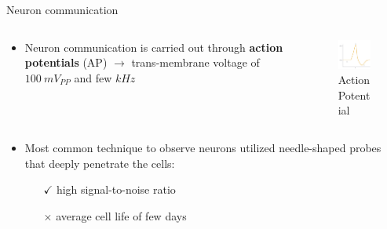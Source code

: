 \documentclass{beamer}
\begin{document}
\begin{frame}{Neuron communication}
\vspace{-1.7cm}
\begin{columns}
    \begin{column}{0.6\textwidth}
        \begin{itemize}
            \item Neuron communication is carried out through \textbf{action potentials} (AP) $\xrightarrow{}$ trans-membrane voltage of $ 100 \: mV_{PP}$ and few $kHz$
        \end{itemize}
    \end{column}
    \begin{column}{0.4\textwidth}
        \begin{figure}
            \vspace{0.6cm}
            \hspace{-1cm}
            \includegraphics[width=5cm]{act_pot.png}
        	\caption{Action Potential}
        \end{figure}
    \end{column}
\end{columns}
\begin{columns}
    \begin{column}{1.1\textwidth}
        \begin{itemize}
        	\item Most common technique to observe neurons utilized needle-shaped probes that deeply penetrate the cells:
            	\begin{itemize}
            	    \item[$\checkmark$] high signal-to-noise ratio
            	    \item[$\times$] average cell life of few days
    	        \end{itemize}
            \end{itemize} 
    \end{column}
\end{columns}
\end{frame}
\end{document}

